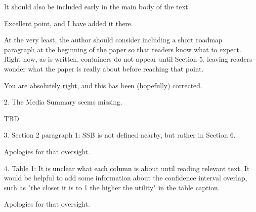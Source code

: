 \begin{referee}
  It should also be included
early in the main body of the text. \end{referee}

\begin{response}
   Excellent point, and I have added it there.
\end{response}


\begin{referee}
At the very least, the author should consider including a short
roadmap paragraph at the beginning of the paper so that readers know what to expect. Right now, as
is written, containers do not appear until Section 5, leaving readers wonder what the paper is really
about before reaching that point.
\end{referee}

\begin{response}
    You are absolutely right, and this has been (hopefully) corrected.
\end{response}


\begin{referee}

2.
The Media Summary seems missing.

\end{referee}

\begin{response}
    TBD
\end{response}


\begin{referee}

3.
Section 2 paragraph 1: SSB is not defined nearby, but rather in Section 6.

\end{referee}

\begin{response}
    Apologies for that oversight.
\end{response}


\begin{referee}
4.
Table 1: It is unclear what each column is about until reading relevant text. It would be helpful to
add some information about the confidence interval overlap, such as "the closer it is to 1 the higher
the utility" in the table caption.
\end{referee}

\begin{response}
    Apologies for that oversight.
\end{response}


